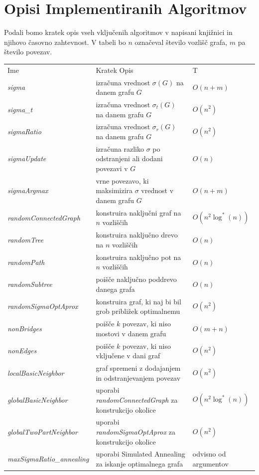 \documentclass[ letterpaper, titlepage, fleqn]{article}
\begin{document}
\section{Opisi Implementiranih Algoritmov}
Podali bomo kratek opis vseh vključenih algoritmov v napisani knjižnici in njihovo časovno zahtevnost.
V tabeli bo $n$ označeval število vozlišč grafa, $m$ pa število povezav.
\begin{center}
    \begin{tabular}{ l  l  l}
      Ime & Kratek Opis & T \\ 
      {\em sigma} & izračuna vrednost $\sigma(G)$ na danem grafu $G$ & $O(n + m)$ \\
      {\em sigma\_t} & izračuna vrednost $\sigma_t(G)$ na danem grafu $G$ & $O(n^2)$ \\
      {\em sigmaRatio} & izračuna vrednost $\sigma_r(G)$ na danem grafu $G$ & $O(n^2)$ \\
      {\em sigmaUpdate} & izračuna razliko $\sigma$ po odstranjeni ali dodani povezavi v $G$ & $O(n)$ \\
      {\em sigmaArgmax} & vrne povezavo, ki maksimizira $\sigma$ vrednost v danem grafu $G$ & $O(n + m)$ \\
      {\em randomConnectedGraph} & konstruira naključni graf na $n$ vozliščih &  $O(n^2 \log^*(n))$ \\ 
      {\em  randomTree} & konstruira naključno drevo na $n$  vozliščih & $O(n)$ \\
      {\em randomPath} & konstruira naključno pot na $n$ vozliščih & $O(n)$ \\
      {\em randomSubtree} & poišče naključno poddrevo danega grafa & $O(n)$ \\
      {\em randomSigmaOptAprox} & konstruira graf, ki naj bi bil grob približek optimalnemu & $O(n^2)$ \\
      {\em nonBridges} & poišče $k$ povezav, ki niso mostovi v danem grafu & $O(m + n)$ \\
      {\em nonEdges} & poišče $k$ povezav, ki niso vključene v dani graf & $O(n^2)$ \\
      {\em localBasicNeighbor} & graf spremeni z dodajanjem in odstranjevanjem povezav & $O(n^2)$ \\
      {\em globalBasicNeighbor} & uporabi {\em randomConnectedGraph} za konstrukcijo okolice & $O(n^2 \log^*(n))$ \\ 
      {\em globalTwoPartNeighbor} & uporabi {\em randomSigmaOptAprox} za konstrukcijo okolice & $O(n^2)$ \\
      {\em maxSigmaRatio\_annealing} & uporabi Simulated Annealing za iskanje optimalnega grafa & odvisno od argumentov \\
    \end{tabular}
  \end{center}
\end{document}
